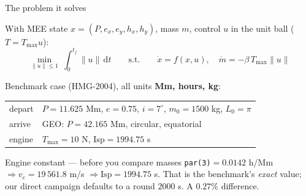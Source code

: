 \documentclass[10pt,aspectratio=169]{beamer}
\newcommand{\code}[1]{\texttt{\small #1}}
\newcommand{\Tmax}{T_{\max}}
\begin{document}
\begin{frame}{The problem it solves}

With MEE state $x = (P,e_x,e_y,h_x,h_y)$, mass $m$, control $u$ in the unit
ball ($T = \Tmax u$):
\begin{equation*}
\min_{\|u\|\le 1}\ \int_{0}^{t_f}\!\|u\|\,\mathrm{d}t
\qquad\text{s.t.}\qquad
\dot x = f(x,u),\quad \dot m = -\beta\,\Tmax\|u\|
\end{equation*}

\vspace{2pt}
Benchmark case (HMG-2004), all units \textbf{Mm, hours, kg}:

\begin{center}\small
\begin{tabular}{@{}ll@{}}
\toprule
depart & $P = 11.625$ Mm, $e = 0.75$, $i = 7^\circ$, $m_0 = 1500$ kg,
$L_0 = \pi$\\
arrive & GEO: $P = 42.165$ Mm, circular, equatorial\\
engine & $\Tmax = 10$ N, $\mathrm{Isp} = 1994.75$ s\\
\bottomrule
\end{tabular}
\end{center}

\begin{alertblock}{Engine constant --- before you compare masses}
\code{par(3)}$= 0.0142$ h/Mm $\Rightarrow v_e = 19\,561.8$ m/s
$\Rightarrow \mathrm{Isp} = 1994.75$ s. That is the benchmark's \emph{exact}
value; our direct campaign defaults to a round $2000$ s. A $0.27\%$
difference.
\end{alertblock}
\end{frame}
\end{document}

